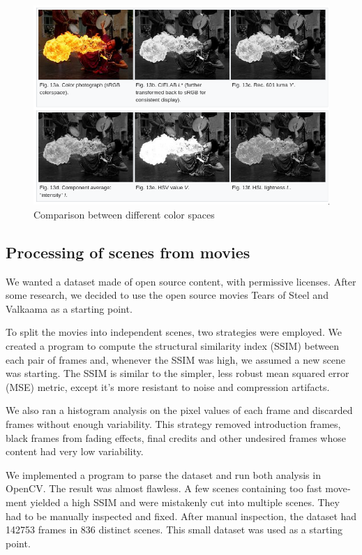 \documentclass[12pt,openright,oneside,a4paper,english]{abntex2}
\begin{document}
\begin{otherlanguage}{english}
\begin{figure}[!htb]
\centering
\includegraphics[width=\textwidth]{Colorspaces}
\caption{Comparison between different color spaces \cite{wiki_HSV}}
\label{hsl_hsv}
\end{figure}

\subsection{Processing of scenes from movies}

We wanted a dataset made of open source content, with permissive licenses. After some research, we decided to use the open source movies Tears of Steel \cite{tears_of_steel_movie} and Valkaama \cite{valkaama_movie} as a starting point.

To split the movies into independent scenes, two strategies were employed. We created a program to compute the structural similarity index (SSIM) between each pair of frames and, whenever the SSIM was high, we assumed a new scene was starting. The SSIM is similar to the simpler, less robust mean squared error (MSE) metric, except it's more resistant to noise and compression artifacts.

We also ran a histogram analysis on the pixel values of each frame and discarded frames without enough variability. This strategy removed introduction frames, black frames from fading effects, final credits and other undesired frames whose content had very low variability.

We implemented a program to parse the dataset and run both analysis in OpenCV. The result was almost flawless. A few scenes containing too fast movement yielded a high SSIM and were mistakenly cut into multiple scenes. They had to be manually inspected and fixed. After manual inspection, the dataset had 142753 frames in 836 distinct scenes. This small dataset was used as a starting point.


\end{otherlanguage}
\end{document}
